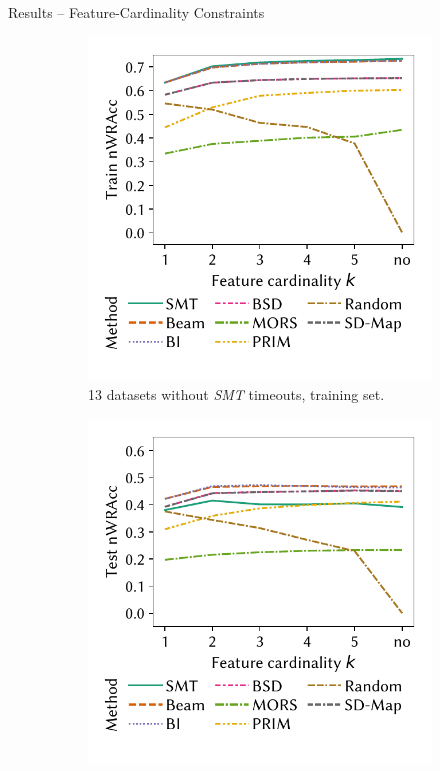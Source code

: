 \documentclass[en, navbaroff, handout]{sdqbeamer}
\begin{document}
\begin{frame}[t]{Results -- Feature-Cardinality Constraints}
\begin{figure}
\begin{subfigure}[t]{0.32\textwidth}
			\includegraphics[width=\textwidth, trim=10 25 10 10, clip]{plots/csd-cardinality-train-nwracc-no-timeout-datasets.pdf}
			\caption{13 datasets without \emph{SMT} timeouts, training set.}
			\label{fig:csd:cardinality-train-nwracc-no-timeout-datasets}
		\end{subfigure}
		\pause
		\hfill
		\begin{subfigure}[t]{0.32\textwidth}
			\centering
			\includegraphics[width=\textwidth, trim=10 25 10 10, clip]{plots/csd-cardinality-test-nwracc-all-datasets.pdf}

\end{subfigure}
\end{figure}
\end{frame}
\end{document}
